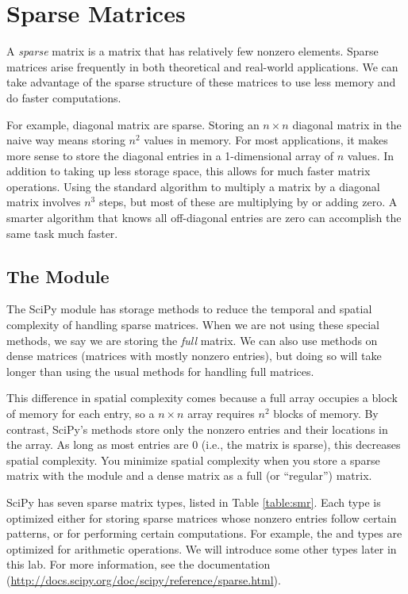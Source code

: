 \section*{Sparse Matrices}
A \emph{sparse} matrix is a matrix that has relatively few nonzero elements. 
Sparse matrices arise frequently in both theoretical and real-world applications. 
We can take advantage of the sparse structure of these matrices to use less memory and do faster computations.

For example, diagonal matrix are sparse. 
Storing an $n \times n$ diagonal matrix in the naive way means storing $n^2$ values in memory. 
For most applications, it makes more sense to store the diagonal entries in a 1-dimensional array of $n$ values. 
In addition to taking up less storage space, this allows for much faster matrix operations. 
Using the standard algorithm to multiply a matrix by a diagonal matrix involves $n^3$ steps, but most of these are multiplying by or adding zero. 
A smarter algorithm that knows all off-diagonal entries are zero can accomplish the same task much faster.

\subsection*{The  Module}
The SciPy module  has storage methods to reduce the temporal and spatial complexity of handling sparse matrices.  
When we are not using these special methods, we say we are storing the \emph{full} matrix. 
We can also use  methods on dense matrices (matrices with mostly nonzero entries), but doing so will take longer than using the usual methods for handling full matrices. 

This difference in spatial complexity comes because a full array occupies a block of memory for each entry, so a $n \times n$ array requires $n^2$ blocks of memory. 
By contrast, SciPy's  methods store only the nonzero entries and their locations in the array. 
As long as most entries are 0 (i.e., the matrix is sparse), this decreases spatial complexity. 
You minimize spatial complexity when you store a sparse matrix with the  module and a dense matrix as a full (or ``regular'') matrix.

SciPy has seven sparse matrix types, listed in Table \ref{table:smr}. 
Each type is optimized either for storing sparse matrices whose nonzero entries follow certain patterns, or for performing certain computations. 
For example, the  and  types are optimized for arithmetic operations. 
We will introduce some other types later in this lab. For more information, see the documentation (\url{http://docs.scipy.org/doc/scipy/reference/sparse.html}).




